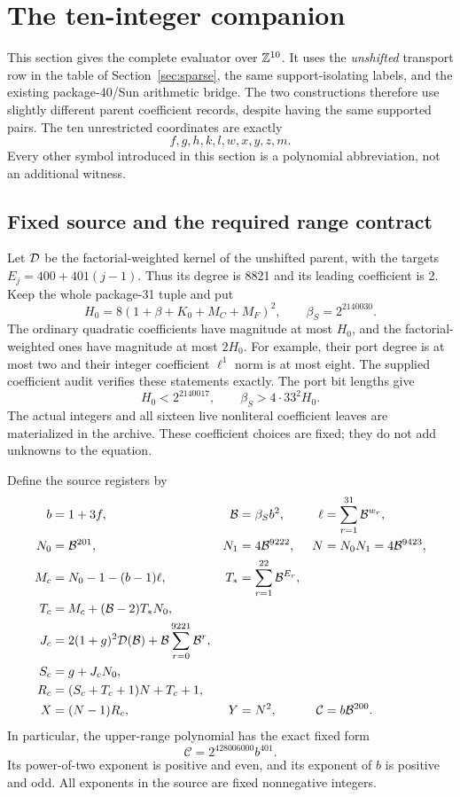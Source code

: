 \section{The ten-integer companion}\label{sec:ten}

This section gives the complete evaluator over $\mathbb Z^{10}$. It uses the
\emph{unshifted} transport row in the table of Section~\ref{sec:sparse},
the same support-isolating labels, and the existing package-40/Sun
arithmetic bridge. The two constructions therefore use slightly different
parent coefficient records, despite having the same supported pairs.
The ten unrestricted coordinates are exactly
\[
f,g,h,k,l,w,x,y,z,m.
\]
Every other symbol introduced in this section is a polynomial
abbreviation, not an additional witness.

\subsection{Fixed source and the required range contract}

Let $\mathcal D$ be the factorial-weighted kernel of the unshifted parent,
with the targets $E_j=400+401(j-1)$. Thus its degree is 8821 and its
leading coefficient is 2. Keep the whole package-31 tuple and put
\[
 H_0=8(1+\beta+K_0+M_C+M_F)^2,
 \qquad \beta_S=2^{2140030}.
\]
The ordinary quadratic coefficients have magnitude at most $H_0$,
and the factorial-weighted ones have magnitude at most $2H_0$.
For example, their port degree is at most two and their integer
coefficient $\ell^1$ norm is at most eight. The supplied coefficient
audit verifies these statements exactly. The port bit lengths give
\[
 H_0<2^{2140017},\qquad
 \beta_S>4\cdot33^2H_0.
\]
The actual integers and all sixteen live nonliteral coefficient leaves
are materialized in the archive. These coefficient choices are fixed;
they do not add unknowns to the equation.

Define the source registers by
\begin{align*}
 b&=1+3f,&\mathcal B&=\beta_Sb^2,&
 \ell&=\sum_{r=1}^{31}\mathcal B^{w_r},\\
 N_0&=\mathcal B^{201},&N_1&=4\mathcal B^{9222},&N&=N_0N_1=4\mathcal B^{9423},\\
 M_c&=N_0-1-(b-1)\ell,&
 T_*&=\sum_{r=1}^{22}\mathcal B^{E_r},\\
 T_c&=M_c+(\mathcal B-2)T_*N_0,\\
 J_c&=2(1+g)^2\mathcal D(\mathcal B)+\mathcal B\sum_{r=0}^{9221}\mathcal B^r,\\
 S_c&=g+J_cN_0,\\
 R_c&=(S_c+T_c+1)N+T_c+1,\\
 X&=(N-1)R_c,&Y&=N^2,&\mathcal C&=b\mathcal B^{200}.
\end{align*}
In particular, the upper-range polynomial has the exact fixed form
\begin{equation}\label{eq:tencap}
 \mathcal C=2^{428006000}b^{401}.
\end{equation}
Its power-of-two exponent is positive and even, and its exponent of
$b$ is positive and odd. All exponents in the source are fixed
nonnegative integers.

